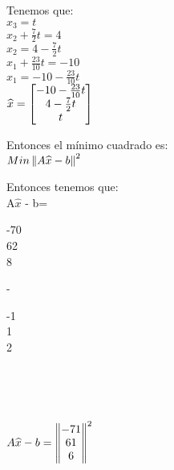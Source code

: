 \begin{frame}
    \begin{solution}
     Tenemos que: \\
    $x_{3}=t$ \\
    $x_{2}+\frac{7}{2}t=4$ \\
    $x_{2} = 4 - \frac{7}{2}t$ \\
    $x_{1}+\frac{23}{10}t = -10$ \\
    $x_{1}= -10 - \frac{23}{10}t$ \\

    \begin{math}
    
    \widehat{x} =
        \begin{bmatrix}
		  -10 - \frac{23}{10}t    \\
		  4 - \frac{7}{2}t   \\
			t  
		\end{bmatrix} \\
    
    \end{math}

    Entonces el mínimo cuadrado es: \\
    \begin{math}
        Min\left \| A\widehat{x}-b \right \| ^ 2 \\
    \end{math}

    Entonces tenemos que: \\
        A$\widehat{x}$ - b= 
        \begin{bmatrix}
		  -70  \\
		  62   \\
			8  
		\end{bmatrix} - 

        \begin{bmatrix}
		  -1  \\
		  1   \\
			2  
		\end{bmatrix} \\
  
    \end{solution}
\end{frame} \\

\begin{frame}
    \begin{solution}
        \begin{math}
            A\widehat{x}-b =
            \begin{Vmatrix}
		  -71  \\
		  61   \\
		  6  
		  \end{Vmatrix} ^2 \\
        \end{math}

    \end{solution}    
\end{frame}